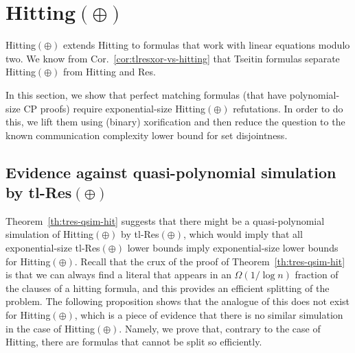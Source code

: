 \documentclass[11pt]{article}
\newcommand{\scterm}[1]{{\textrm{\sc #1}}}
\newcommand{\hit}{\scterm{Hitting}}
\newcommand{\tres}{\scterm{tl-Res}}
\newcommand{\res}{\scterm{Res}}
\newcommand{\tresp}{{\tres}$(\oplus)$}
\newcommand{\cp}{\scterm{CP}}
\newcommand{\hitp}{{\hit}$(\oplus)$}
\numberwithin{equation}{section}
\begin{document}
\section{\texorpdfstring{\hitp}{Hitting(xor)}}
\label{sec:hitp-lowerbound}


{\hitp} extends {\hit} to formulas that work with linear equations modulo two.
We know from Cor.~\ref{cor:tlresxor-vs-hitting} that Tseitin formulas
separate {\hitp} from {\hit} and {\res}.

In this section, we show that perfect matching formulas (that have polynomial-size {\cp} proofs) require exponential-size
{\hitp} refutations. In order to do this, we lift them using (binary) xorification
and then reduce the question to the known communication complexity lower bound 
for set disjointness. 

\subsection{Evidence against quasi-polynomial simulation by \texorpdfstring{{\tresp}}{tl-Res(+)}}
\label{sec:no-qp-simulation}
Theorem~\ref{th:tres-qsim-hit} suggests that there might be a quasi-polynomial simulation of {\hitp} by {\tresp}, which would imply that all exponential-size {\tresp} lower bounds imply exponential-size lower bounds for {\hitp}. Recall that the crux of the proof of Theorem~\ref{th:tres-qsim-hit} is that we can always find a literal that appears in an $\Omega(1/\log n)$ fraction of the clauses of a hitting formula, and this provides an efficient splitting of the problem. The following proposition shows that the analogue of this does not exist for {\hitp}, which is a piece of evidence that there is no similar simulation in the case of {\hitp}. Namely, we prove that, contrary to the case of {\hit}, there are formulas that cannot be split so efficiently.
\end{document}
